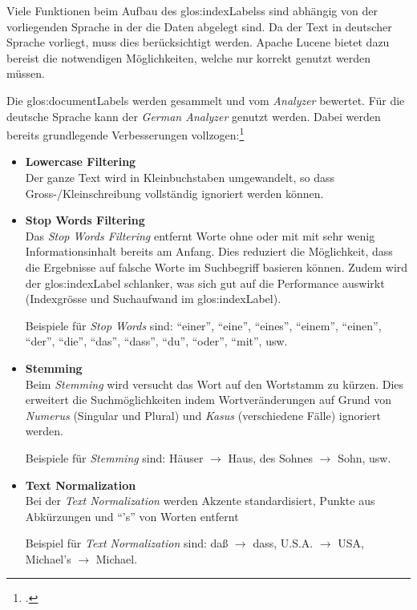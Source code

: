 Viele Funktionen beim Aufbau des \glspl{glos:indexLabel}s sind abhängig von der vorliegenden Sprache in der die Daten abgelegt sind.
Da der Text in deutscher Sprache vorliegt, muss dies berücksichtigt werden.
Apache Lucene bietet dazu bereist die notwendigen Möglichkeiten, welche nur korrekt genutzt werden müssen.

Die \glspl{glos:documentLabel} werden gesammelt und vom \textit{Analyzer} bewertet. Für die deutsche Sprache kann der \textit{German Analyzer} genutzt werden.
Dabei werden bereits grundlegende Verbesserungen vollzogen:\footcite{Inner_workings_of_the_German_Analyzer_in_Lucene_2016-05-08}
\begin{itemize}
	\item \textbf{Lowercase Filtering}\\
	Der ganze Text wird in Kleinbuchstaben umgewandelt, so dass Gross-/Kleinschreibung vollständig ignoriert werden können.

	\item \textbf{Stop Words Filtering}\\
	Das \textit{Stop Words Filtering} entfernt Worte ohne oder mit mit sehr wenig Informationsinhalt bereits am Anfang.
	Dies reduziert die Möglichkeit, dass die Ergebnisse auf falsche Worte im Suchbegriff basieren können.
	Zudem wird der \gls{glos:indexLabel} schlanker, was sich gut auf die Performance auswirkt (Indexgrösse und Suchaufwand im \gls{glos:indexLabel}).

	Beispiele für \textit{Stop Words} sind:
	"`einer"', "`eine"', "`eines"', "`einem"', "`einen"', "`der"', "`die"', "`das"', "`dass"', "`du"', "`oder"', "`mit"', usw.

	\item \textbf{Stemming}\\
	Beim \textit{Stemming} wird versucht das Wort auf den Wortstamm zu kürzen.
	Dies erweitert die Suchmöglichkeiten indem Wortveränderungen auf Grund von \textit{Numerus} (Singular und Plural) und \textit{Kasus} (verschiedene Fälle) ignoriert werden.

	Beispiele für \textit{Stemming} sind:
	Häuser $\rightarrow$ Haus, des Sohnes $\rightarrow$ Sohn, usw.

	\item \textbf{Text Normalization}\\
	Bei der \textit{Text Normalization} werden Akzente standardisiert, Punkte aus Abkürzungen und "`'s"' von Worten entfernt

	Beispiel für \textit{Text Normalization} sind:
	daß $\rightarrow$ dass, U.S.A. $\rightarrow$ USA, Michael's $\rightarrow$ Michael.

\end{itemize}


